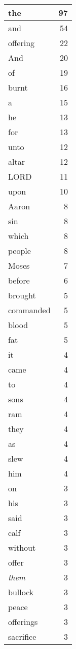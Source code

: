 \begin{center}
\begin{longtable}{l|r}
\hline \hline
\endlastfoot
the & 97 \\ \hline
and & 54 \\ \hline
offering & 22 \\ \hline
And & 20 \\ \hline
of & 19 \\ \hline
burnt & 16 \\ \hline
a & 15 \\ \hline
he & 13 \\ \hline
for & 13 \\ \hline
unto & 12 \\ \hline
altar & 12 \\ \hline
LORD & 11 \\ \hline
upon & 10 \\ \hline
Aaron & 8 \\ \hline
sin & 8 \\ \hline
which & 8 \\ \hline
people & 8 \\ \hline
Moses & 7 \\ \hline
before & 6 \\ \hline
brought & 5 \\ \hline
commanded & 5 \\ \hline
blood & 5 \\ \hline
fat & 5 \\ \hline
it & 4 \\ \hline
came & 4 \\ \hline
to & 4 \\ \hline
sons & 4 \\ \hline
ram & 4 \\ \hline
they & 4 \\ \hline
as & 4 \\ \hline
slew & 4 \\ \hline
him & 4 \\ \hline
on & 3 \\ \hline
his & 3 \\ \hline
said & 3 \\ \hline
calf & 3 \\ \hline
without & 3 \\ \hline
offer & 3 \\ \hline
\emph{them} & 3 \\ \hline
bullock & 3 \\ \hline
peace & 3 \\ \hline
offerings & 3 \\ \hline
sacrifice & 3 \\ \hline

\end{longtable}
\end{center}
